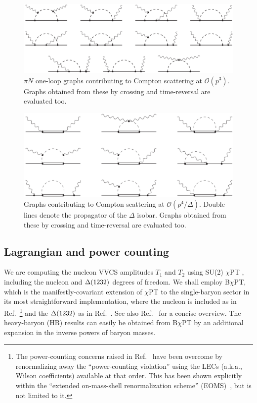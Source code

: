 \documentclass[11pt,preprint,tightenlines,
showpacs,preprintnumbers,amsmath,amssymb,superscriptaddress,a4paper,nofootinbib]{revtex4-1}
\begin{document}
 \begin{figure}[t]
 \centering
 \includegraphics[width=0.95\columnwidth]{Diags1_pv.pdf} 
\caption{%
$\pi N$ one-loop graphs contributing to Compton scattering at $\mathcal{O}(p^3)$. Graphs obtained from these by
crossing and time-reversal are evaluated too.
}
\label{Fig:loops_pv}
\end{figure}



\begin{figure}
\centering
\includegraphics[width=0.9\columnwidth]{DeltaDiags4.pdf} 
\caption{%
Graphs contributing to Compton scattering at  $\mathcal{O}(p^4/\mathit{\Delta})$. 
Double lines denote the propagator of the $\Delta$ isobar.
Graphs obtained from these by
crossing and time-reversal are evaluated too.}
\label{Fig:loopsD}
\end{figure}

\subsection{Lagrangian and power counting}
We are computing the nucleon VVCS amplitudes $T_{1}$ and $T_{2}$
using SU(2) $\chi$PT \cite{Weinberg:1978kz,Gasser:1983yg},
including the nucleon and $\Delta(1232)$ 
degrees of freedom.  We shall employ B$\chi$PT, which is the manifestly-covariant extension of $\chi$PT to the single-baryon sector in its most straightforward
implementation, where
the nucleon
is included as in Ref.~\cite{Gasser:1987rb}\footnote{The power-counting concerns  
raised in Ref.~\cite{Gasser:1987rb} have been overcome by renormalizing away the ``power-counting
violation'' using the LECs (a.k.a., Wilson coefficients) available at that order.
 This has been shown explicitly within the  ``extended on-mass-shell renormalization scheme'' (EOMS)~\cite{Fuchs:2003qc}, 
 but is not limited to it.} and the $\Delta(1232)$ as in Ref.~\cite{Pascalutsa:2006up}. See also Ref.~\cite{Geng:2013xn} for a concise overview.
The heavy-baryon (HB) results can easily be obtained from B$\chi$PT by an additional expansion in the inverse powers of baryon masses. 
\end{document}

